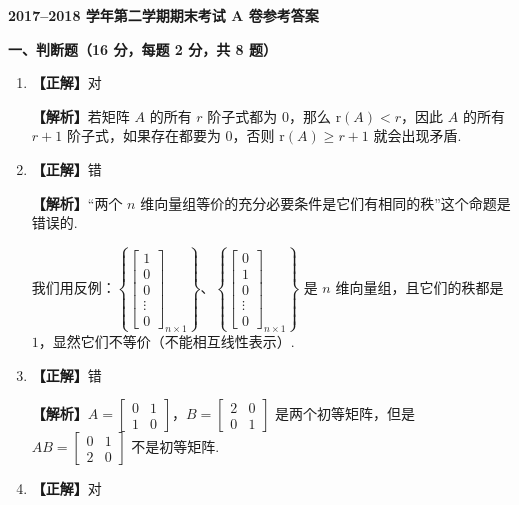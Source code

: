 \documentclass[a4paper,11pt]{ctexart}
\newcommand{\rk}{\mathrm{r}}
\begin{document}
\begin{center}
  {\Large\bfseries 2017--2018 学年第二学期期末考试 A 卷参考答案}
\end{center}

\vspace{0.8em}

\textbf{一、判断题（16 分，每题 2 分，共 8 题）}

\begin{enumerate}[label=\arabic*., leftmargin=2em, itemsep=0.65em, topsep=0.5em]
  \item \textbf{【正解】}对

  \textbf{【解析】}若矩阵 $A$ 的所有 $r$ 阶子式都为 $0$，那么 $\rk(A) < r$，因此 $A$ 的所有 $r+1$ 阶子式，如果存在都要为 $0$，否则 $\rk(A) \geqslant r + 1$ 就会出现矛盾.

  \item \textbf{【正解】}错

  \textbf{【解析】}“两个 $n$ 维向量组等价的充分必要条件是它们有相同的秩”这个命题是错误的.

  我们用反例：$\left\{\begin{bmatrix} 1 \\ 0 \\ 0 \\ \vdots \\ 0 \end{bmatrix}_{n\times 1}\right\}$、$\left\{\begin{bmatrix} 0 \\ 1 \\ 0 \\ \vdots \\ 0 \end{bmatrix}_{n\times 1}\right\}$ 是 $n$ 维向量组，且它们的秩都是 $1$，显然它们不等价（不能相互线性表示）.

  \item \textbf{【正解】}错

  \textbf{【解析】}$A = \begin{bmatrix} 0 & 1 \\ 1 & 0 \end{bmatrix}$，$B = \begin{bmatrix} 2 & 0 \\ 0 & 1 \end{bmatrix}$ 是两个初等矩阵，但是 $AB = \begin{bmatrix} 0 & 1 \\ 2 & 0 \end{bmatrix}$ 不是初等矩阵.

  \item \textbf{【正解】}对


\end{enumerate}
\end{document}
